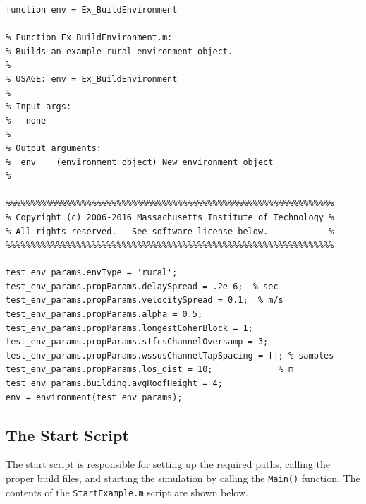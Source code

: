 \begin{lstlisting}[name=exEnv]
function env = Ex_BuildEnvironment

% Function Ex_BuildEnvironment.m:
% Builds an example rural environment object.
%
% USAGE: env = Ex_BuildEnvironment
%
% Input args:
%  -none-
%
% Output arguments:
%  env    (environment object) New environment object
%

%%%%%%%%%%%%%%%%%%%%%%%%%%%%%%%%%%%%%%%%%%%%%%%%%%%%%%%%%%%%%%%%%
% Copyright (c) 2006-2016 Massachusetts Institute of Technology %
% All rights reserved.   See software license below.            %
%%%%%%%%%%%%%%%%%%%%%%%%%%%%%%%%%%%%%%%%%%%%%%%%%%%%%%%%%%%%%%%%%

test_env_params.envType = 'rural';
test_env_params.propParams.delaySpread = .2e-6;  % sec
test_env_params.propParams.velocitySpread = 0.1;  % m/s
test_env_params.propParams.alpha = 0.5;
test_env_params.propParams.longestCoherBlock = 1;
test_env_params.propParams.stfcsChannelOversamp = 3;
test_env_params.propParams.wssusChannelTapSpacing = []; % samples
test_env_params.propParams.los_dist = 10;             % m
test_env_params.building.avgRoofHeight = 4;
env = environment(test_env_params);
\end{lstlisting}

\subsection{The Start Script}

The start script is responsible for setting up the required paths,
calling the proper build files, and starting the simulation by
calling the \verb+Main()+ function.  The contents of the
\verb+StartExample.m+ script are shown below.

